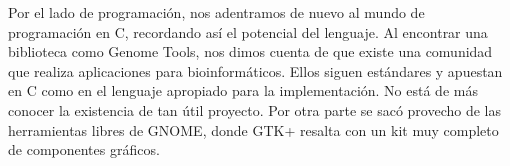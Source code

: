 \documentclass{article}
\begin{document}
	Por el lado de programación, nos adentramos de nuevo al mundo de programación en C, recordando así el potencial del lenguaje. Al encontrar una biblioteca como Genome Tools, nos dimos cuenta de que existe una comunidad que realiza aplicaciones para bioinformáticos. Ellos siguen estándares y apuestan en C como en el lenguaje apropiado para la implementación. No está de más conocer la existencia de tan útil proyecto. Por otra parte se sacó provecho de las herramientas libres de GNOME, donde GTK+ resalta con un kit muy completo de componentes gráficos.
	
	
	
	
\end{document}
